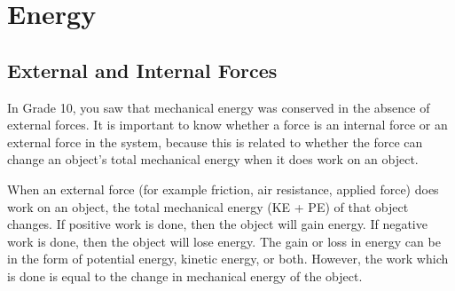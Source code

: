 \section{Energy}

\subsection{External and Internal Forces}
In Grade 10, you saw that mechanical energy was conserved in the absence of external forces. It is important to know whether a force is an internal force or an external force in the system, because this is related to whether the force can change an object's total mechanical energy when it does work on an object. 

When an external force (for example friction, air resistance, applied force) does work on an object, the total mechanical energy (KE + PE) of that object changes. If positive work is done, then the object will gain energy. If negative work is done, then the object will lose energy. The gain or loss in energy can be in the form of potential energy, kinetic energy, or both. However, the work which is done is equal to the change in mechanical energy of the object.


